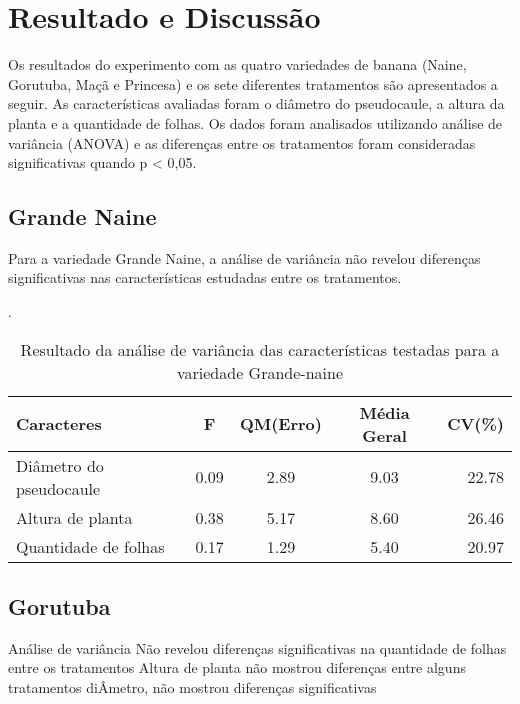 \chapter{Resultado e Discussão}

Os resultados do experimento com as quatro variedades de banana (Naine, Gorutuba, Maçã e Princesa) e os sete diferentes tratamentos são apresentados a seguir. As características avaliadas foram o diâmetro do pseudocaule, a altura da planta e a quantidade de folhas. Os dados foram analisados utilizando análise de variância (ANOVA) e as diferenças entre os tratamentos foram consideradas significativas quando p < 0,05.
\section{Grande Naine}

Para a variedade Grande Naine, a análise de variância não revelou diferenças significativas nas características estudadas entre os tratamentos.

\begin{table}[!htb]
 	\begin{center}
 		\caption{Resultado da análise de variância das características testadas para a variedade Grande-naine}.
	 	\begin{tabular*}{\textwidth}{@{\extracolsep{\fill}}lcccr}
 		\toprule
 		\toprule
 		\textbf{Caracteres} & \textbf{F}  & \textbf{QM(Erro)} & \textbf{Média Geral} &\textbf {CV(\%)} \\
		\hline
		Diâmetro do pseudocaule &0.09	&2.89		&9.03 	&22.78 \\
		Altura de planta 		&0.38 	&5.17 		&8.60 	&26.46 \\
		Quantidade de folhas 	&0.17  	&1.29 		&5.40 	&20.97\\
		\hline
		\hline
 		\end{tabular*}
 	\end{center}
\end{table}

\section{Gorutuba}
Análise de variância Não revelou diferenças significativas na quantidade de folhas entre os tratamentos
Altura de planta não mostrou diferenças entre alguns tratamentos
diÂmetro, não mostrou diferenças significativas

